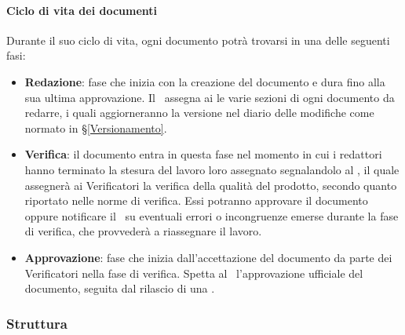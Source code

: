 			\paragraph{Ciclo di vita dei documenti}\label{PS:Documentazione:Implementazione:CicloVita}
			Durante il suo ciclo di vita, ogni documento potrà trovarsi in una delle seguenti fasi:
			\begin{itemize}
				\item \textbf{Redazione}: fase che inizia con la creazione del documento e dura fino alla sua ultima approvazione.
					Il \Res\ assegna ai  le varie sezioni di ogni documento da redarre, i quali aggiorneranno la versione nel diario delle modifiche
					come normato in \S\ref{Versionamento}.
				\item \textbf{Verifica}: il documento entra in questa fase nel momento in cui i redattori hanno terminato la stesura del lavoro loro assegnato
					segnalandolo al \Res, il quale assegnerà ai Verificatori la verifica della qualità del prodotto, secondo quanto riportato nelle norme di verifica.
					Essi potranno approvare il documento oppure notificare il \Res\ su eventuali errori o incongruenze emerse durante la fase di verifica, che provvederà
					a riassegnare il lavoro.
				\item \textbf{Approvazione}: fase che inizia dall'accettazione del documento da parte dei Verificatori nella fase di verifica. Spetta al \Res\
					l'approvazione ufficiale del documento, seguita dal rilascio di una .
			\end{itemize}

		\subsubsection{Struttura}\label{PS:Documentazione:Struttura}

